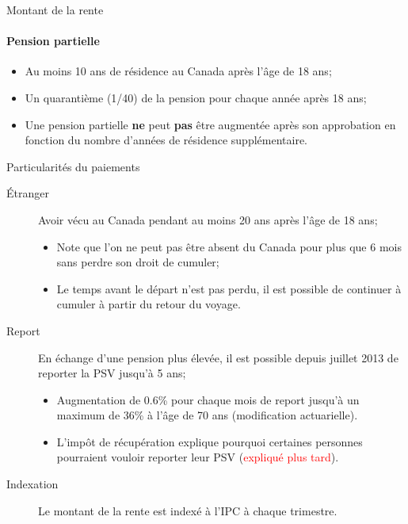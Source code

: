 \documentclass[10pt, french]{article}
\begin{document}
\begin{multicols*}{3}
\begin{conceptgen}{Montant de la rente}
\paragraph*{Pension partielle}
\begin{itemize}[leftmargin = *]
	\item	Au moins 10 ans de résidence au Canada après l'âge de 18 ans;
	\item	Un quarantième (1/40) de la pension pour chaque année après 18 ans;
	\item	Une pension partielle \textbf{ne} peut \textbf{pas} être augmentée après son approbation en fonction du nombre d'années de résidence supplémentaire.
\end{itemize}
\end{conceptgen}

\begin{conceptgen}{Particularités du paiements}
\begin{description}
	\item[Étranger]	Avoir vécu au Canada pendant au moins 20 ans après l'âge de 18 ans;
		\begin{itemize}[leftmargin = *]
		\item	Note que l'on ne peut pas être absent du Canada pour plus que 6 mois sans perdre son droit de cumuler;
		\item   Le temps avant le départ n'est pas perdu, il est possible de continuer à cumuler à partir du retour du voyage.
		\end{itemize}
	\item[Report] En échange d'une pension plus élevée, il est possible depuis juillet 2013 de reporter la PSV jusqu'à 5 ans;
		\begin{itemize}[leftmargin = *]
		\item	Augmentation de 0.6\% pour chaque mois de report jusqu'à un maximum de 36\% à l'âge de 70 ans (modification actuarielle).
		\item   L'impôt de récupération explique pourquoi certaines personnes pourraient vouloir reporter leur PSV (\textcolor{red}{expliqué plus tard}).
		\end{itemize}
	\item[Indexation]	Le montant de la rente est indexé à l'IPC à chaque trimestre.
\end{description}
\end{conceptgen}


\end{multicols*}
\end{document}
